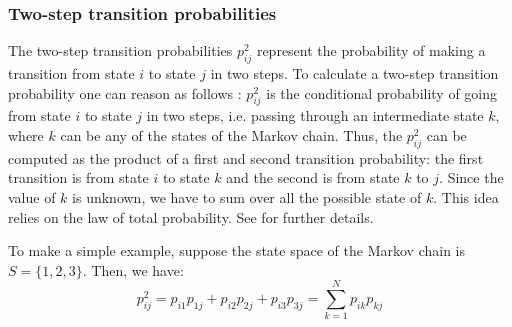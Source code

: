 \subsubsection{Two-step transition probabilities}

\noindent The two-step transition probabilities $p_{ij}^2$ represent the probability of making a transition from state $i$ to state $j$ in two steps. To calculate a two-step transition probability one can reason as follows \citep{Sheskin2010}: $p_{ij}^2$ is the conditional probability of going from state $i$ to state $j$ in two steps, i.e. passing through an intermediate state $k$, where $k$ can be any of the states of the Markov chain. Thus, the $p_{ij}^2$ can be computed as the product of a first and second transition probability: the first transition is from state $i$ to state $k$ and the second is from state $k$ to $j$. Since the value of $k$ is unknown, we have to sum over all the possible state of $k$. This idea relies on the law of total probability. See \cite{Zwillinger2000} for further details.

To make a simple example, suppose the state space of the Markov chain is $S = \{ 1,2,3\}$. Then, we have:
\begin{equation}
    p_{ij}^2 = p_{i1}p_{1j} + p_{i2}p_{2j} + p_{i3}p_{3j} = \sum_{k=1}^N p_{ik}p_{kj}
\end{equation}


